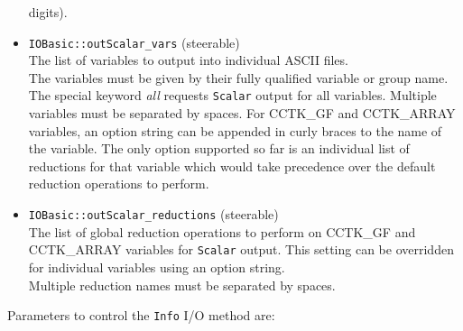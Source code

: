 \documentclass{article}
\begin{document}
\begin{itemize}
        digits).
  \item {\tt IOBasic::outScalar\_vars} (steerable)\\
        The list of variables to output into individual ASCII files.\\
        The variables must be given by their fully qualified variable or group
        name. The special keyword {\it all} requests {\tt Scalar}
        output for all
        variables. Multiple variables must be separated by spaces.
        For CCTK\_GF and CCTK\_ARRAY variables, an option string can
        be appended 
        in curly braces to the name of the variable. The only option
        supported so far is an individual list of reductions for that variable
        which would take precedence over the default reduction operations to
        perform.
  \item {\tt IOBasic::outScalar\_reductions} (steerable)\\
        The list of global reduction operations to perform on
        CCTK\_GF and CCTK\_ARRAY variables for {\tt Scalar} output.
        This setting can be overridden for individual variables using an
        option string.\\
        Multiple reduction names must be separated by spaces.
\end{itemize}
%
%
Parameters to control the {\tt Info} I/O method are:
\end{document}
